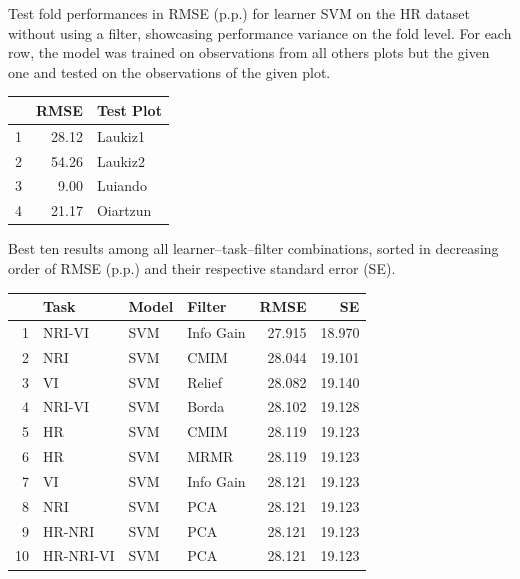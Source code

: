 \documentclass[remotesensing,article,accept,moreauthors,pdftex]{Definitions/mdpi}
\begin{document}
\begin{paracol}{2}
%
\begin{specialtable}[H]
\setlength{\tabcolsep}{18.7mm}
\caption{Test fold performances in RMSE (p.p.) for learner SVM on the HR dataset without using a filter, showcasing performance variance on the fold level. For each row, the model was trained on observations from all others plots but the given one and tested on the observations of the given plot.}
\label{tab:svm-single-fold-perf}
\begin{tabular}{rrl}
\toprule
 & \textbf{RMSE} & \textbf{Test Plot} \\
  \midrule
1 & 28.12 & Laukiz1 \\
  2 & 54.26 & Laukiz2 \\
  3 & 9.00 & Luiando \\
  4 & 21.17 & Oiartzun \\
   \bottomrule
\end{tabular}
\end{specialtable}
\vspace{-12pt}

%
\begin{specialtable}[H]
\setlength{\tabcolsep}{6mm}
\caption{Best ten results among all learner--task--filter combinations, sorted in decreasing order of RMSE (p.p.) and their respective standard error (SE).}
\label{tab:perf-top-10}
\begin{tabular}{rlllrr}
\toprule
 & \textbf{Task} & \textbf{Model} & \textbf{Filter} & \textbf{RMSE} & \textbf{SE} \\
  \midrule
1 & NRI-VI & SVM & Info Gain & 27.915 & 18.970 \\
  2 & NRI & SVM & CMIM & 28.044 & 19.101 \\
  3 & VI & SVM & Relief & 28.082 & 19.140 \\
  4 & NRI-VI & SVM & Borda & 28.102 & 19.128 \\
  5 & HR & SVM & CMIM & 28.119 & 19.123 \\
  6 & HR & SVM & MRMR & 28.119 & 19.123 \\
  7 & VI & SVM & Info Gain & 28.121 & 19.123 \\
  8 & NRI & SVM & PCA & 28.121 & 19.123 \\
  9 & HR-NRI & SVM & PCA & 28.121 & 19.123 \\
  10 & HR-NRI-VI & SVM & PCA & 28.121 & 19.123 \\
   \bottomrule
\end{tabular}
\end{specialtable}
\vspace{-12pt}


\end{paracol}
\end{document}
